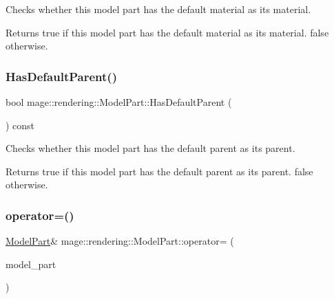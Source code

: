 Checks whether this model part has the default material as its material.

\begin{DoxyReturn}{Returns}
{\ttfamily true} if this model part has the default material as its material. {\ttfamily false} otherwise. 
\end{DoxyReturn}
\mbox{\label{structmage_1_1rendering_1_1_model_part_ac452d6bba03decae31646eec0329c4ab}} 
\subsubsection{\texorpdfstring{Has\+Default\+Parent()}{HasDefaultParent()}}
{\footnotesize\ttfamily bool mage\+::rendering\+::\+Model\+Part\+::\+Has\+Default\+Parent (\begin{DoxyParamCaption}{ }\end{DoxyParamCaption}) const\hspace{0.3cm}{\ttfamily [noexcept]}}

Checks whether this model part has the default parent as its parent.

\begin{DoxyReturn}{Returns}
{\ttfamily true} if this model part has the default parent as its parent. {\ttfamily false} otherwise. 
\end{DoxyReturn}
\mbox{\label{structmage_1_1rendering_1_1_model_part_a9d6c372839b9493df4b432d8ba2613dc}} 
\subsubsection{\texorpdfstring{operator=()}{operator=()}\hspace{0.1cm}{\footnotesize\ttfamily [1/2]}}
{\footnotesize\ttfamily \mbox{\hyperlink{structmage_1_1rendering_1_1_model_part}{Model\+Part}}\& mage\+::rendering\+::\+Model\+Part\+::operator= (\begin{DoxyParamCaption}\item[{const \mbox{\hyperlink{structmage_1_1rendering_1_1_model_part}{Model\+Part}} \&}]{model\+\_\+part }\end{DoxyParamCaption})\hspace{0.3cm}{\ttfamily [default]}}

